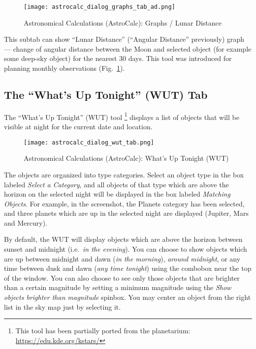 \begin{figure}[htbp]
\centering\texttt{[image: astrocalc\_dialog\_graphs\_tab\_ad.png]}
\caption{Astronomical Calculations (AstroCalc): Graphs / Lunar Distance}
\label{fig:gui:AstroCalc:Graphs:LD}
\end{figure}

This subtab  can show ``Lunar Distance'' (``Angular Distance'' previously) graph --- change of angular distance between the Moon and selected object (for example some deep-sky object) for the nearest 30 days. This tool was introduced for planning monthly observations (Fig.~\ref{fig:gui:AstroCalc:Graphs:LD}).

\subsection{The ``What's Up Tonight'' (WUT) Tab}
\label{sec:gui:AstroCalc:WUT}

The ``What's Up Tonight'' (WUT) tool%
	\footnote{This tool has been partially ported from the  planetarium: \url{https://edu.kde.org/kstars/}}
 displays a list of objects that will be visible at night for the current date and location.

\begin{figure}[htbp]
\centering\texttt{[image: astrocalc\_dialog\_wut\_tab.png]}
\caption{Astronomical Calculations (AstroCalc): What's Up Tonight (WUT)}
\label{fig:gui:AstroCalc:WUT}
\end{figure}

The objects are organized into type categories. Select an object type in the box labeled 
\emph{Select a Category}, and all objects of that type which are above the horizon on the selected night 
will be displayed in the box labeled \emph{Matching Objects}. For example, in the screenshot, 
the Planets category has been selected, and three planets which are up in the selected night are displayed (Jupiter, Mars and Mercury). 

By default, the WUT will display objects which are above the horizon between sunset and midnight (i.e.\ \emph{in the evening}). 
You can choose to show objects which are up between midnight and dawn (\emph{in the morning}), 
\emph{around midnight}, 
or any time between dusk and dawn (\emph{any time tonight}) using the combobox near the top of the window. 
You can also choose to see only those objects that are brighter than a certain magnitude by 
setting a minimum magnitude using the \emph{Show objects brighter than magnitude} spinbox. 
You may center an object from the right list in the sky map just by selecting it.

